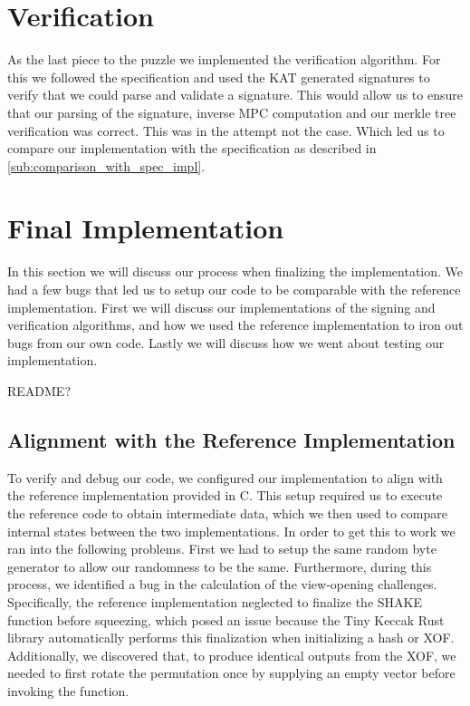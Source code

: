 \documentclass[11pt]{report}
\theoremstyle{definition}
\theoremstyle{plain}
\begin{document}
\section{Verification}\label{sub:verification}
As the last piece to the puzzle we implemented the verification algorithm. For this we followed the specification and used the KAT generated signatures to verify that we could parse and validate a signature. This would allow us to ensure that our parsing of the signature, inverse MPC computation and our merkle tree verification was correct. This was in the attempt not the case. Which led us to compare our implementation with the specification as described in \autoref{sub:comparison_with_spec_impl}.


\section{Final Implementation}\label{sub:final}
In this section we will discuss our process when finalizing the implementation. We had a few bugs that led us to setup our code to be comparable with the reference implementation. First we will discuss our implementations of the signing and verification algorithms, and how we used the reference implementation to iron out bugs from our own code. Lastly we will discuss how we went about testing our implementation.

README?

\subsection{Alignment with the Reference Implementation}\label{sub:comparison_with_spec_impl}
To verify and debug our code, we configured our implementation to align with the reference implementation provided in C. This setup required us to execute the reference code to obtain intermediate data, which we then used to compare internal states between the two implementations. In order to get this to work we ran into the following problems. First we had to setup the same random byte generator to allow our randomness to be the same. Furthermore, during this process, we identified a bug in the calculation of the view-opening challenges. Specifically, the reference implementation neglected to finalize the SHAKE function before squeezing, which posed an issue because the Tiny Keccak Rust library automatically performs this finalization when initializing a hash or XOF.
Additionally, we discovered that, to produce identical outputs from the XOF, we needed to first rotate the permutation once by supplying an empty vector before invoking the function.
\end{document}
